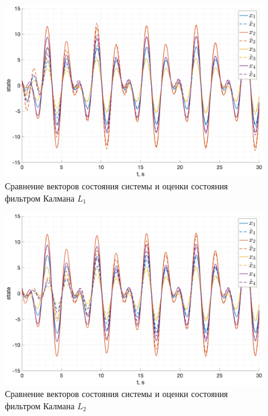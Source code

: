 \begin{figure}[ht!]
    \centering
    \includegraphics[width=\textwidth]{media/plots/kalman_task2/state_cmp_1.png}
    \caption{Сравнение векторов состояния системы и оценки состояния фильтром Калмана $L_1$}
    \label{fig:kalman1_x}
\end{figure}
\begin{figure}[ht!]
    \centering
    \includegraphics[width=\textwidth]{media/plots/kalman_task2/state_cmp_2.png}
    \caption{Сравнение векторов состояния системы и оценки состояния фильтром Калмана $L_2$}
    \label{fig:kalman2_x}
\end{figure}

